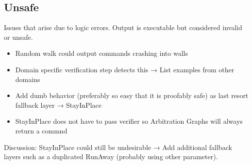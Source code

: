 \subsection{Unsafe}
Issues that arise due to logic errors. Output is executable but considered invalid or unsafe.
\begin{itemize}
    \item Random walk could output commands crashing into walls
    \item Domain specific verification step detects this → List examples from other domains
    \item Add dumb behavior (preferably so easy that it is proofably safe) as last resort fallback layer → StayInPlace
    \item StayInPlace does not have to pass verifier so Arbitration Graphs will always return a commnd
\end{itemize}
Discussion: StayInPlace could still be undesirable → Add additional fallback layers such as a duplicated RunAway (probably using other parameter).
